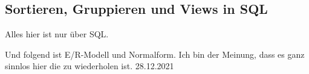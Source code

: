 \subsection{Sortieren, Gruppieren und Views in SQL}
Alles hier ist nur \"uber SQL.

Und folgend ist E/R-Modell und Normalform. Ich bin der Meinung, dass es ganz sinnlos hier die zu wiederholen ist. 28.12.2021